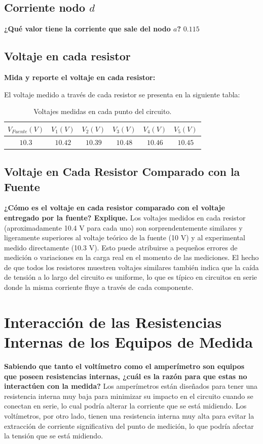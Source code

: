 \subsection{Corriente nodo $d$}
\textbf{¿Qué valor tiene la corriente que sale del nodo $a$?} \underline{$0.115$}

\subsection{Voltaje en cada resistor}
\textbf{Mida y reporte el voltaje en cada resistor:}

El voltaje medido a través de cada resistor se presenta en la siguiente tabla:

\begin{table}[h]
\centering
\begin{tabular}{|c|c|c|c|c|c|}
\hline
\(V_{Fuente} (V)\) & \(V_1 (V)\) & \(V_2 (V)\) & \(V_3 (V)\) & \(V_4 (V)\) & \(V_5 (V)\) \\ \hline
$10.3$     & $10.42$       & $10.39$       & $10.48$       & $10.46$       & $10.45$       \\ \hline
\end{tabular}
\caption{Voltajes medidas en cada punto del circuito.}
\label{tab:volt_measurements}
\end{table}

\subsection{Voltaje en Cada Resistor Comparado con la Fuente}
\textbf{¿Cómo es el voltaje en cada resistor comparado con el voltaje entregado por la fuente? Explique.}
Los voltajes medidos en cada resistor (aproximadamente 10.4 V para cada uno) son sorprendentemente similares y ligeramente superiores al voltaje teórico de la fuente (10 V) y al experimental medido directamente (10.3 V). Esto puede atribuirse a pequeños errores de medición o variaciones en la carga real en el momento de las mediciones. El hecho de que todos los resistores muestren voltajes similares también indica que la caída de tensión a lo largo del circuito es uniforme, lo que es típico en circuitos en serie donde la misma corriente fluye a través de cada componente.

\section{Interacción de las Resistencias Internas de los Equipos de Medida}
\textbf{Sabiendo que tanto el voltímetro como el amperímetro son equipos que poseen resistencias internas, ¿cuál es la razón para que estas no interactúen con la medida?}
Los amperímetros están diseñados para tener una resistencia interna muy baja para minimizar su impacto en el circuito cuando se conectan en serie, lo cual podría alterar la corriente que se está midiendo. Los voltímetros, por otro lado, tienen una resistencia interna muy alta para evitar la extracción de corriente significativa del punto de medición, lo que podría afectar la tensión que se está midiendo.

